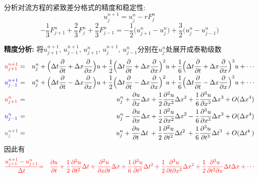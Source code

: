 \begin{problem}[问题5]
分析对流方程的紧致差分格式的精度和稳定性:
\[
u_j^{n+1} = u_j^n -rF_j^n
\]
\[
-\frac{1}{3}F_{j+1}^n + \frac{2}{3}F_j^n + \frac{2}{3}F_{j-1}^n
= -\frac{1}{2}\big(u_{j+1}^n-u_j^n\big) + \frac{3}{2}\big(u_j^n-u_{j-1}^n\big)
\]
\end{problem}

\begin{solution}
\textbf{精度分析:} 将$u_{j+1}^{n+1}$, $u_{j-1}^{n+1}$, $u_{j+1}^{n}$, $u_{j}^{n+1}$,
$u_{j-1}^{n}$分别在$u_{j}^{n}$处展开成泰勒级数
{\setlength\arraycolsep{2pt}
\begin{eqnarray*}
\textcolor{red}{u_{j+1}^{n+1}} & = & u_{j}^{n}+\Big(\Delta t\frac{\partial}{\partial t}+\Delta x\frac{\partial}{\partial x}\Big)u+\frac{1}{2}\Big(\Delta t\frac{\partial}{\partial t}+\Delta x\frac{\partial}{\partial x}\Big)^{2}u+\frac{1}{6}\Big(\Delta t\frac{\partial}{\partial t}+\Delta x\frac{\partial}{\partial x}\Big)^{3}u+\cdots\\
\textcolor{blue}{u_{j-1}^{n+1}} & = & u_{j}^{n}+\Big(\Delta t\frac{\partial}{\partial t}-\Delta x\frac{\partial}{\partial x}\Big)u+\frac{1}{2}\Big(\Delta t\frac{\partial}{\partial t}-\Delta x\frac{\partial}{\partial x}\Big)^{2}u+\frac{1}{6}\Big(\Delta t\frac{\partial}{\partial t}-\Delta x\frac{\partial}{\partial x}\Big)^{3}u+\cdots\\
\textcolor{red}{u_{j+1}^{n\hphantom{+1}}} & = & u_{j}^{n}+\frac{\partial u}{\partial x}\Delta x+\frac{1}{2}\frac{\partial^{2}u}{\partial x^{2}}\Delta x^{2}+\frac{1}{6}\frac{\partial^{3}u}{\partial x^{3}}\Delta x^{3}+O(\Delta x^{4})\\
\textcolor{blue}{ u_{j-1}^{n\hphantom{+1}}} & = & u_{j}^{n}-\frac{\partial u}{\partial x}\Delta x+\frac{1}{2}\frac{\partial^{2}u}{\partial x^{2}}\Delta x^{2}-\frac{1}{6}\frac{\partial^{3}u}{\partial x^{3}}\Delta x^{3}+O(\Delta x^{4})\\
\textcolor[rgb]{0.33,0.33,0.33}{u_{j}^{n+1}} & = & u_{j}^{n}+\frac{\partial u}{\partial t}\Delta t\:+\frac{1}{2}\frac{\partial^{2}u}{\partial t^{2}}\Delta t^{2}\:+\frac{1}{6}\frac{\partial^{3}u}{\partial t^{3}}\Delta t^{3}\:+O(\Delta t^{4}\:)
\end{eqnarray*}}
因此有
{\setlength\arraycolsep{2pt}
\begin{eqnarray*}
\textcolor{red}{\frac{u_{j+1}^{n+1}-u_{j+1}^{n}}{\Delta t}}
          & \textcolor{red}{=} & \textcolor{red}{\frac{\partial u}{\partial t}+\frac{1}{2}\frac{\partial^{2}u}{\partial t^{2}}\Delta t+\frac{\partial^{2}u}{\partial x\partial t}\Delta x
          +\frac{1}{6}\frac{\partial^{3}u}{\partial t^{3}}\Delta t^{2}+\frac{1}{2}\frac{\partial^{3}u}{\partial t\partial x^{2}}\Delta x^{2}+\frac{1}{2}\frac{\partial^{3}u}{\partial t^{2}\partial x}\Delta t\Delta x+\cdots}\\

\end{eqnarray*}}
\end{solution}
